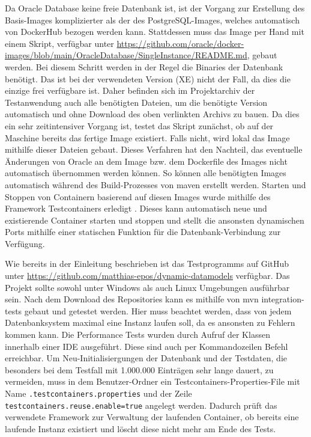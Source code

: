 Da Oracle Database keine freie Datenbank ist, ist der Vorgang zur Erstellung des Basis-Images komplizierter als der des PostgreSQL-Images, welches automatisch von DockerHub bezogen werden kann. Stattdessen muss das Image per Hand mit einem Skript, verfügbar unter \url{https://github.com/oracle/docker-images/blob/main/OracleDatabase/SingleInstance/README.md}, gebaut werden. Bei diesem Schritt werden in der Regel die Binaries der Datenbank benötigt. Das ist bei der verwendeten Version (XE) nicht der Fall, da dies die einzige frei verfügbare ist. Daher befinden sich im Projektarchiv der Testanwendung auch alle benötigten Dateien, um die benötigte Version automatisch und ohne Download des oben verlinkten Archivs zu bauen. Da dies ein sehr zeitintensiver Vorgang ist, testet das Skript zunächst, ob auf der Maschine bereits das fertige Image existiert. Falls nicht, wird lokal das Image mithilfe dieser Dateien gebaut. Dieses Verfahren hat den Nachteil, das eventuelle Änderungen von Oracle an dem Image bzw. dem Dockerfile des Images nicht automatisch übernommen werden können.
So können alle benötigten Images automatisch während des Build-Prozesses von maven erstellt werden.
Starten und Stoppen von Containern basierend auf diesen Images wurde mithilfe des Framework Testcontainers erledigt \cite{testcontainers.13.07.2021}. Dieses kann automatisch neue und existierende Container starten und stoppen und stellt die ansonsten dynamischen Ports mithilfe einer statischen Funktion für die Datenbank-Verbindung zur Verfügung.

Wie bereits in der Einleitung beschrieben ist das Testprogramms auf GitHub unter \url{https://github.com/matthias-epos/dynamic-datamodels} verfügbar. Das Projekt sollte sowohl unter Windows als auch Linux Umgebungen ausführbar sein. Nach dem Download des Repositories kann es mithilfe von mvn integration-tests gebaut und getestet werden. Hier muss beachtet werden, dass von jedem Datenbanksystem maximal eine Instanz laufen soll, da es ansonsten zu Fehlern kommen kann. Die Performance Tests wurden durch Aufruf der Klassen innerhalb einer IDE ausgeführt. Diese sind auch per Kommandozeilen Befehl erreichbar. Um Neu-Initialisiergungen der Datenbank und der Testdaten, die besonders bei dem Testfall mit 1.000.000 Einträgen sehr lange dauert, zu vermeiden, muss in dem Benutzer-Ordner ein Testcontainers-Properties-File mit Name \lstinline|.testcontainers.properties| und der Zeile \lstinline|testcontainers.reuse.enable=true| angelegt werden. Dadurch prüft das verwendete Framework zur Verwaltung der laufenden Container, ob bereits eine laufende Instanz existiert und löscht diese nicht mehr am Ende des Tests.


